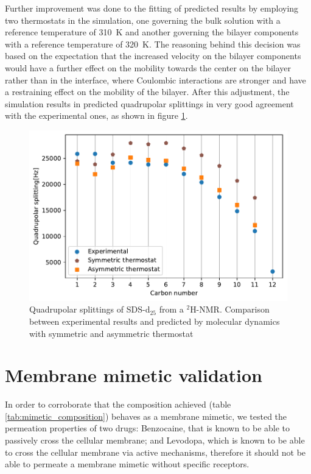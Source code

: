 \documentclass[twoside,twocolumn,9pt]{article}
\begin{document}
Further improvement was done to the fitting of predicted results by employing
two thermostats in the simulation, one governing the bulk solution with a
reference temperature of \SI{310}{K} and another governing the bilayer
components with a reference temperature of \SI{320}{K}. The reasoning behind
this decision was based on the expectation that the increased velocity on the
bilayer components would have a further effect on the mobility towards the
center on the bilayer rather than in the interface, where Coulombic interactions
are stronger and have a restraining effect on the mobility of the bilayer. After
this adjustment, the simulation results in predicted quadrupolar splittings in
very good agreement with the experimental ones, as shown in figure
\ref{fig:2nd_calibration}.

\begin{figure}[h]
\centering
  \includegraphics[width=\columnwidth]{calibration2}
  \caption{Quadrupolar splittings of SDS-d$_{25}$ from a $^2$H-NMR. Comparison
    between experimental results and predicted by molecular dynamics with
    symmetric and asymmetric thermostat}
  \label{fig:2nd_calibration}
\end{figure}

\section{Membrane mimetic validation}
\label{sec:validation}

In order to corroborate that the composition achieved (table
\ref{tab:mimetic_composition}) behaves as a membrane mimetic, we tested the
permeation properties of two drugs: Benzocaine, that is known to be able to passively
cross the cellular membrane; and Levodopa, which is known to be able to cross the
cellular membrane via active mechanisms, therefore it should not be able to
permeate a membrane mimetic without specific receptors.
\end{document}
